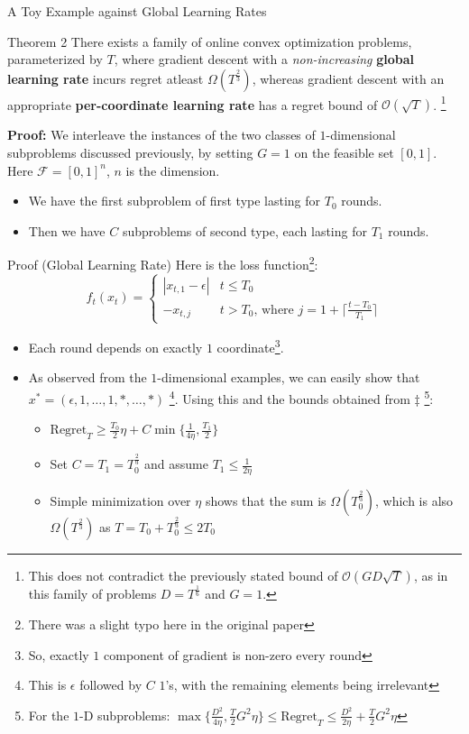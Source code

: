 \documentclass[
	11pt, %
]{beamer}
\begin{document}
\begin{frame}{A Toy Example against Global Learning Rates}
    \begin{block}{Theorem 2}
        There exists a family of online convex optimization problems, parameterized by $T$, where gradient descent with a \textit{non-increasing} \textbf{global learning rate} incurs regret atleast $\Omega(T^{\frac{2}{3}})$, whereas gradient descent with an appropriate \textbf{per-coordinate learning rate} has a regret bound of $\mathcal{O}(\sqrt{T})$. \footnote{This does not contradict the previously stated bound of $\mathcal{O}(GD\sqrt{T})$, as in this family of problems $D = T^{\frac{1}{6}}$ and $G = 1$.}
    \end{block}
    \textbf{Proof:} We interleave the instances of the two classes of $1$-dimensional subproblems discussed previously, by setting $G = 1$ on the feasible set $[0,1]$. Here $\mathcal{F} = [0,1]^{n}$, $n$ is the dimension.
    \begin{itemize}
        \item We have the first subproblem of first type lasting for $T_0$ rounds.
        \item Then we have $C$ subproblems of second type, each lasting for $T_1$ rounds.
    \end{itemize}
\end{frame}

\begin{frame}{Proof (Global Learning Rate)}
    Here is the loss function\footnote{There was a slight typo here in the original paper}:
    $$
    f_t(x_t) = \begin{cases}
        |x_{t,1} - \epsilon| & t \le T_0 \\
        -x_{t,j} & t > T_0 \text{, where } j = 1 + \lceil \frac{t-T_0}{T_1} \rceil
    \end{cases}
    $$
    \begin{itemize}
        \item Each round depends on exactly $1$ coordinate\footnote{So, exactly $1$ component of gradient is non-zero every round}.
        \item As observed from the $1$-dimensional examples, we can easily show that $x^* = (\epsilon, 1, \dots, 1, *, \dots, *)$ \footnote{This is $\epsilon$ followed by $C$ $1$'s, with the remaining elements being irrelevant}. Using this and the bounds obtained from \textbf{$\ddag$} \footnote{For the $1$-D subproblems: $\max \{\frac{D^2}{4\eta}, \frac{T}{2} G^2 \eta\} \le \text{Regret}_T \le \frac{D^2}{2\eta} + \frac{T}{2} G^2 \eta$}:
        \begin{itemize}
            \item $\text{Regret}_T \ge \frac{T_0}{2} \eta + C \min \{\frac{1}{4\eta}, \frac{T_1}{2}\}$
            \item Set $C = T_1 = T_0^{\frac{2}{3}}$ and assume $T_1 \le \frac{1}{2\eta}$
            \item Simple minimization over $\eta$ shows that the sum is $\Omega(T_0^{\frac{2}{3}})$, which is also $\Omega(T^{\frac{2}{3}})$ as $T = T_0 + T_0^{\frac{2}{3}} \le 2T_0$
        \end{itemize}
    \end{itemize}
\end{frame}
\end{document}
